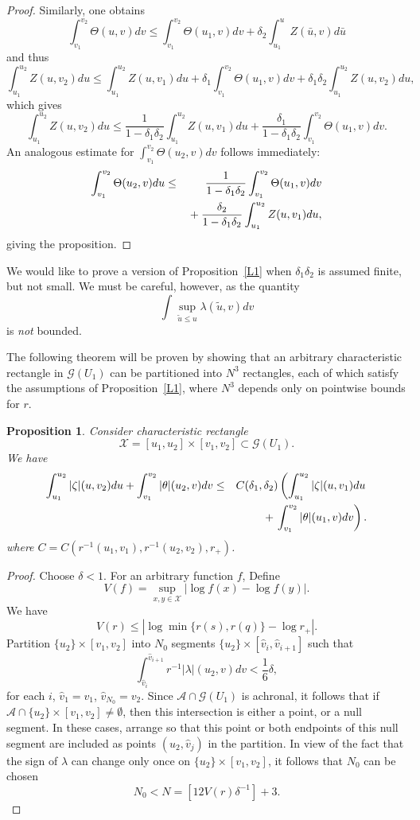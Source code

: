 \documentclass{article}
\newtheorem{proposition}[theorem]{Proposition}
\begin{document}
{\begin{proof}
Similarly,
one obtains
\[
\int_{v_1}^{v_2}{\Theta(u,v)dv}\le\int_{v_1}^{v_2}{\Theta(u_1,v) dv} +
\delta_2\int_{u_1}
^{u}{Z(\bar{u},v)d\bar{u}}
\]
and thus
\[
\int_{u_1}^{u_2}{Z(u,v_2)du}\le \int_{u_1}^{u_2}{Z(u,v_1)du}+
\delta_1\int_{v_1}^{v_2}{\Theta(u_1,v) dv}+\delta_1\delta_2 
\int_{u_1}^{u_2}{Z(u,v_2)du},
\]
which gives
\[
\int_{u_1}^{u_2}{Z(u,v_2)du}\le\frac{1}{1-\delta_1\delta_2}\int_{u_1}^{u_2}{Z(u,v_1)du}+
\frac{\delta_1}{1-\delta_1\delta_2}\int_{v_1}^{v_2}{\Theta(u_1,v) dv}.
\]
An analogous estimate for $\int_{v_1}^{v_2}{\Theta(u_2,v)dv}$ follows immediately:
\begin{eqnarray}
\label{analogous}
\nonumber
\int_{v_1}^{v_2}{\Theta(u_2,v)du}
&\le&\frac{1}{1-\delta_1\delta_2}\int_{v_1}^{v_2}{\Theta(u_1,v) dv}\\
&&\hbox{}+
\frac{\delta_2}{1-\delta_1\delta_2}\int_{u_1}^{u_2}{Z (u,v_1)du},
\end{eqnarray}
giving the proposition. \end{proof}

We would like to prove a version of Proposition~\ref{L1} when 
$\delta_1\delta_2$ is assumed finite, but not small.
We must be careful, however,
as the quantity
\[
\int{\sup_{\tilde{u}\le u}\lambda(\tilde{u},v)dv}
\]
is \emph{not} bounded.

The following theorem will be proven by showing
that an arbitrary characteristic rectangle in $\mathcal{G}(U_1)$
can be partitioned into $N^3$ rectangles, each of which satisfy
the assumptions of Proposition~\ref{L1}, where $N^3$ depends only on
pointwise bounds for $r$.

\begin{proposition}
\label{Estimates}
Consider 
characteristic rectangle 
\[
\mathcal{X}=[u_1,u_2]\times[v_1,v_2]\subset\mathcal{G}(U_1).
\]
We have
\begin{eqnarray*}
\int_{u_1}^{u_2}{|\zeta|(u,v_2)du}+\int_{v_1}^{v_2}{|\theta|(u_2,v)dv}
&\le&
C(\delta_1,\delta_2)\left(\int_{u_1}^{u_2}{|\zeta|(u,v_1)du}\right.\\
&&\hbox{}+\left.
\int_{v_1}^{v_2}{|\theta|(u_1,v)dv}\right).
\end{eqnarray*}
where $C=C(r^{-1}(u_1,v_1),r^{-1}(u_2,v_2),r_+)$.
\end{proposition}

\begin{proof}
Choose $\delta<1$. For an arbitrary function $f$,
Define
\[
V(f)=\sup_{x,y\in \mathcal{X}}{|\log f(x)-\log f(y)|}.
\]
We have
\[
V(r)\le\left|\log\min\{r(s),r(q)\}-\log r_+\right|.
\]
Partition $\{u_2\}\times[v_1,v_2]$ into $N_0$ segments
$\{u_2\}\times[\hat{v}_i,\hat{v}_{i+1}]$
such that
\[
\int_{\hat{v}_i}^{\hat{v}_{i+1}}{r^{-1}|\lambda|(u_2,v) dv}<\frac16\delta,
\]
for each $i$, $\hat{v}_1=v_1$, $\hat{v}_{N_0}=v_2$.
Since $\mathcal{A}\cap\mathcal{G}(U_1)$ is achronal,
it follows that if $\mathcal{A}\cap\{u_2\}\times[v_1,v_2]\ne\emptyset$,
then this intersection is either a point, or a null segment. In these cases,
arrange so
that this point or both endpoints of this null segment are included
as points $(u_2,\hat{v}_j)$ in the partition.
In view of the fact that the sign of $\lambda$ can change only once
on $\{u_2\}\times[v_1,v_2]$, it follows that 
$N_0$ can be chosen
\[
N_0<N=[12V(r)\delta^{-1}]+3.
\]


\end{proof}}
\end{document}
